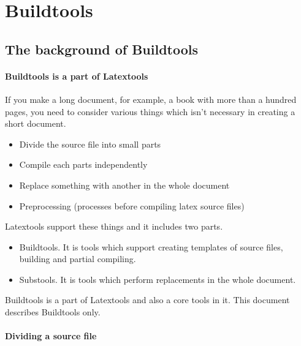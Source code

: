 \hypertarget{buildtools}{%
\section{Buildtools}\label{buildtools}}

\hypertarget{the-background-of-buildtools}{%
\subsection{The background of
Buildtools}\label{the-background-of-buildtools}}

\hypertarget{buildtools-is-a-part-of-latextools}{%
\paragraph{Buildtools is a part of
Latextools}\label{buildtools-is-a-part-of-latextools}}

If you make a long document, for example, a book with more than a
hundred pages, you need to consider various things which isn't necessary
in creating a short document.

\begin{itemize}
\tightlist
\item
  Divide the source file into small parts
\item
  Compile each parts independently
\item
  Replace something with another in the whole document
\item
  Preprocessing (processes before compiling latex source files)
\end{itemize}

Latextools support these things and it includes two parts.

\begin{itemize}
\tightlist
\item
  Buildtools. It is tools which support creating templates of source
  files, building and partial compiling.
\item
  Substools. It is tools which perform replacements in the whole
  document.
\end{itemize}

Buildtools is a part of Latextools and also a core tools in it. This
document describes Buildtools only.

\hypertarget{dividing-a-source-file}{%
\paragraph{Dividing a source file}\label{dividing-a-source-file}}

